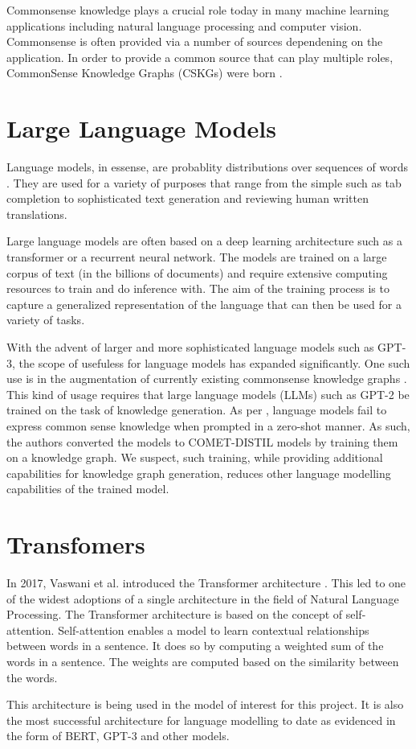 \documentclass[\main/thesis.tex]{subfiles}
\begin{document}
Commonsense knowledge plays a crucial role today in many machine learning applications including
natural language processing and computer vision. Commonsense is often provided via a number 
of sources dependening on the application. In order to provide a common source that can play
multiple roles, CommonSense Knowledge Graphs (CSKGs) were born \cite{ilievski_cskg_2021}.


\section{Large Language Models}\label{sec:largeLanguageModel}

Language models, in essense, are probablity distributions over sequences of words \cite{jurafsky_speech_2009}. 
They are used for a variety of purposes that range from the simple such as tab completion to 
sophisticated text generation and reviewing human written translations. 

Large language models are often based on a deep learning architecture such as a transformer
or a recurrent neural network. The models are trained on a large corpus of text 
(in the billions of documents) and require extensive computing resources to train and 
do inference with. The aim of the training process is to capture a generalized 
representation of the language that can then be used for a variety of tasks. 

With the advent of larger and more sophisticated language models such as GPT-3\cite{brown_language_2020}, the scope
of usefuless for language models has expanded significantly. One such use is in the 
augmentation of currently existing commonsense knowledge graphs \cite{west_symbolic_2021}.
This kind of usage requires that large language models (LLMs) such as GPT-2 be trained on the task
of knowledge generation. As per \citeauthor{west_symbolic_2021}, language models fail to express common 
sense knowledge when prompted in a zero-shot manner. As such, the authors converted the models
to COMET-DISTIL models by training them on a knowledge graph. We suspect, such training, while providing 
additional capabilities for knowledge graph generation, reduces other language modelling capabilities
of the trained model. 

\section{Transfomers}\label{sec:transformers}
In 2017, Vaswani et al. introduced the Transformer architecture \cite{vaswani2017attention}. 
This led to one of the widest adoptions of a single architecture in the field of Natural Language
Processing. The Transformer architecture is based on the concept of self-attention. 
Self-attention enables a model to learn contextual relationships between words in a sentence.
It does so by computing a weighted sum of the words in a sentence. The weights are computed
based on the similarity between the words. 

This architecture is being used in the model of interest for this project. It is also 
the most successful architecture for language modelling to date as evidenced in the form
of BERT, GPT-3 and other models.
\end{document}
